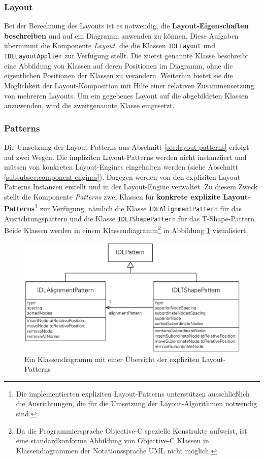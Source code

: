 \subsubsection{Layout}

Bei der Berechnung des Layouts ist es notwendig, die \textbf{Layout-Eigenschaften beschreiben} und auf ein Diagramm anwenden zu können. Diese Aufgaben übernimmt die Komponente \textit{Layout}, die die Klassen \texttt{IDLLayout} und \texttt{IDLLayoutApplier} zur Verfügung stellt. Die zuerst genannte Klasse beschreibt eine Abbildung von Klassen auf deren Positionen im Diagramm, ohne die eigentlichen Positionen der Klassen zu verändern. Weiterhin bietet sie die Möglichkeit der Layout-Komposition mit Hilfe einer relativen Zusammensetzung von mehreren Layouts. Um ein gegebenes Layout auf die abgebildeten Klassen anzuwenden, wird die zweitgenannte Klasse eingesetzt.

\subsubsection{Patterns}
\label{subsubsec:patterns}

Die Umsetzung der Layout-Patterns aus Abschnitt \ref{sec:layout-patterns} erfolgt auf zwei Wegen. Die impliziten Layout-Patterns werden nicht instanziiert und müssen von konkreten Layout-Engines eingehalten werden (siehe Abschnitt \ref{subsubsec:component-engines}). Dagegen werden von den expliziten Layout-Patterns Instanzen erstellt und in der Layout-Engine verwaltet. Zu diesem Zweck stellt die Komponente \textit{Patterns} zwei Klassen für \textbf{konkrete explizite Layout-Patterns}\footnote{Die implementierten expliziten Layout-Patterns unterstützen ausschließlich die Ausrichtungen, die für die Umsetzung der Layout-Algorithmen notwendig sind.} zur Verfügung, nämlich die Klasse \texttt{IDLAlignment\-Pat\-tern} für das Ausrichtungspattern und die Klasse \texttt{IDLTShapePattern} für das T-Shape-Pattern. Beide Klassen werden in einem Klassendiagramm\footnote{Da die Programmiersprache Objective-C spezielle Konstrukte aufweist, ist eine standardkonforme Abbildung von Objective-C Klassen in Klassendiagrammen der Notationssprache UML nicht möglich.} in Abbildung \ref{fig:layout-patterns-implementation} visualisiert.

\begin{figure}[hbt]
    \centering
    \includegraphics[scale=0.8]{resources/layout-patterns-implementation}
    \caption{Ein Klassendiagramm mit einer Übersicht der expliziten Layout-Patterns}
    \label{fig:layout-patterns-implementation}
\end{figure}

